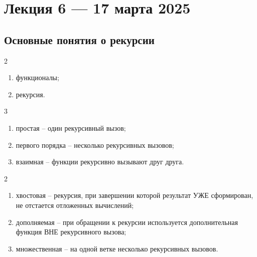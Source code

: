 \chapter{Лекция 6 — 17 марта 2025}

\section{Основные понятия о рекурсии}

\begin{listbox}{\noindent \begin{listboxtitle}{}2\end{listboxtitle} 
    \raisebox{6pt}{Методы организации повторных вычислений:}}
\begin{enumerate}
	\item функционалы;
	\item рекурсия.
\end{enumerate}
\end{listbox}

\begin{listbox}{\noindent \begin{listboxtitle}{}3\end{listboxtitle} 
    \raisebox{6pt}{Классификация рекурсии:}}
\begin{enumerate}
	\item простая -- один рекурсивный вызов;
	\item первого порядка -- несколько рекурсивных вызовов;
	\item взаимная -- функции рекурсивно вызывают друг друга.
\end{enumerate}
\end{listbox}

\begin{listbox}{\noindent \begin{listboxtitle}{}2\end{listboxtitle} 
    \raisebox{6pt}{Классификация рекурсии в рамках классификации:}}
\begin{enumerate}
	\item хвостовая -- рекурсия, при завершении которой результат УЖЕ 
    сформирован, не отстается отложенных вычислений;
	\item дополняемая -- при обращении к рекурсии используется дополнительная
    функция ВНЕ рекурсивного вызова;
    \item множественная -- на одной ветке несколько рекурсивных вызовов.
\end{enumerate}
\end{listbox}

